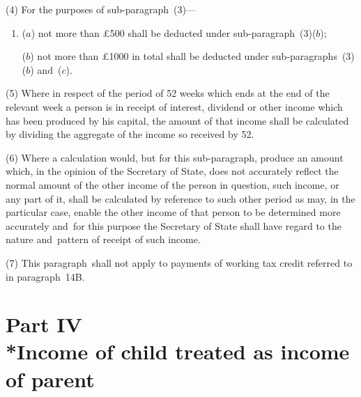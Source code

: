 \documentclass[12pt,a4paper]{article}
\begin{document}
(4) For the purposes of sub-paragraph~(3)—
\begin{enumerate}\item[]
($a$) not more than £500 shall be deducted under sub-paragraph~(3)($b$);

($b$) not more than £1000 in total shall be deducted under sub-\hspace{0pt}paragraphs~(3)($b$) and~($c$).
\end{enumerate}

(5) Where in respect of the period of 52 weeks which ends at the end of the relevant week a person is in receipt of interest, dividend or other income which has been produced by his capital, the amount of that income shall be calculated by dividing the aggregate of the income so received by 52.

(6) Where a calculation would, but for this sub-paragraph, produce an amount which, in the opinion of the 
Secretary of State,  %
does not accurately reflect the normal amount of the other income of the person in question, such income, or any part of it, shall be calculated by reference to such other period as may, in the particular case, enable the other income of that person to be determined more accurately and~for this purpose the 
Secretary of State  %
shall have regard to the nature and~pattern of receipt of such income.

(7) This paragraph~shall not apply to payments of working tax credit referred to in paragraph~14B.


\section[Part IV --- Income of child treated as income of parent]{Part IV\\*Income of child treated as income of parent}

\renewcommand\parthead{--- Schedule 1 Part IV}
\end{document}
